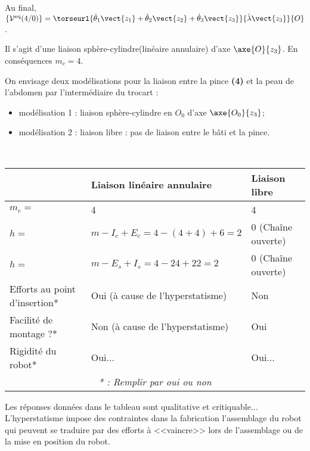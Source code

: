 \begin{multicols}{2}
\begin{corrige}
Au final, $\left\{\mathcal{V}^{\text{eq}}({4}/{0})\right\}=\torseurl{\dot{\theta}_1\vect{z_1}+\dot{\theta}_2\vect{z_2}+\dot{\theta}_3\vect{z_3}}{\dot{\lambda}\vect{z_3}}{O}$.
 
 Il s'agit d'une liaison sphère-cylindre(linéaire annulaire) d'axe $\axe{O}{z_3}$. En conséquences $m_c=4$.
\end{corrige}
\else
\fi

\ifprof
\else

On envisage deux modélisations pour la liaison entre la pince \textbf{(4)} et la peau de l’abdomen par l’intermédiaire du trocart :
\begin{itemize}
\item modélisation 1 : liaison sphère-cylindre en $O_0$ d’axe $\axe{O_0}{z_3}$;
\item modélisation 2 : liaison libre : pas de liaison entre le bâti et la pince.
\end{itemize}

\fi


\ifprof


\begin{corrige} ~\\
\footnotesize
\begin{center}
\begin{tabular}{|p{2.2cm}|p{2cm}|p{2cm}|}
\hline
& Liaison linéaire annulaire & Liaison libre  \\
\hline
$m_c=$ & 4 & 4\\ \hline
$h=$ & $m-I_c+E_c = 4 - (4+4) + 6 = 2$ &0 (Chaîne ouverte)\\ 
$h=$ & $m-E_s+I_s = 4 - 24 + 22 = 2$ &0 (Chaîne ouverte)\\ 
 \hline
Efforts au point d'insertion* & Oui (à cause de l'hyperstatisme)& Non \\ \hline
Facilité de montage ?* & Non (à cause de l'hyperstatisme)& Oui \\ \hline
Rigidité du robot* & Oui... &  Oui...\\ \hline
\multicolumn{3}{c}{\textit{* : Remplir par oui ou non}}
\end{tabular}
\end{center}
\normalsize
Les réponses données dans le tableau sont qualitative et critiquable... L'hyperstatisme impose des contraintes dans la fabrication l'assemblage du robot qui peuvent se traduire par des efforts à <<vaincre>> lors de l'assemblage ou de la mise en position du robot. 


\end{corrige}
\end{multicols}
